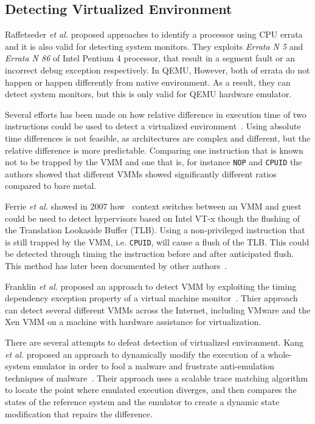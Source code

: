 \subsection{Detecting Virtualized Environment}
Raffetseder \textit{et al.} proposed approaches to identify a processor 
using CPU errata~\cite{raffetseder2007} and it is also valid for detecting system monitors. 
They exploits \textit{Errata N 5} and \textit{Errata N 86} of Intel Pentium 4 processor, 
that result in a segment fault or an incorrect debug exception respectively. 
In QEMU, However, both of errata do not happen or happen differently from native environment. 
As a result, they can detect system monitors, but this is only valid for QEMU hardware emulator.

Several efforts has been made on how relative difference in execution time of
two instructions could be used to detect a virtualized
environment~\cite{raffetseder2007, thompson}. Using absolute time differences is
not feasible, as architectures are complex and different, but the relative
difference is more predictable. Comparing one instruction that is known not to
be trapped by the VMM and one that is, for instance {\tt NOP} and {\tt CPUID}
the authors showed that different VMMs showed significantly different ratios
compared to bare metal.

Ferrie \textit{et al.} showed in 2007 how~\cite{ferrie2007} context switches between an
VMM and guest could be used to detect hypervisors based on Intel VT-x though the
flushing of the Translation Lookaside Buffer (TLB). Using a non-privileged
instruction that is still trapped by the VMM, i.e. {\tt CPUID}, will cause a
flush of the TLB. This could be detected through timing the instruction before
and after anticipated flush. This method has later been documented by other
authors~\cite{thompson}.

Franklin \textit{et al.} proposed an approach to detect VMM by exploiting the timing dependency exception property of a virtual machine monitor~\cite{franklin2008}. Thier approach can detect several different VMMs across the Internet, including VMware and the Xen VMM on a machine with hardware assistance for virtualization.

There are several attempts to defeat detection of virtualized environment. 
Kang \textit{et al.} proposed an approach to dynamically modify the execution of 
a whole-system emulator in order to fool a malware and frustrate anti-emulation techniques 
of malware~\cite{kang2009}. Their approach uses a scalable trace matching algorithm to locate 
the point where emulated execution diverges, and then compares the states of the reference system 
and the emulator to create a dynamic state modification that repairs the difference. 



